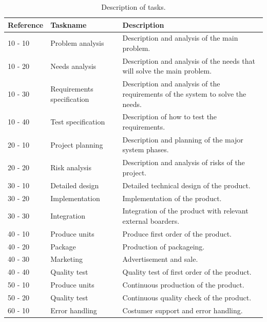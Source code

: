 \begin{table}[H]
\begin{tabular}{|l|l|p{9cm}|}
\hline
\textbf{Reference} & \textbf{Taskname} & \textbf{Description} \\ \hline
10 - 10 & Problem analysis & Description and analysis of the main problem. 
\\  \hline
10 - 20 & Needs analysis & Description and analysis of the needs that will solve the main problem. 
\\  \hline
10 - 30 & Requirements specification & Description and analysis of the requirements of the system to solve the needs. 
\\  \hline 
10 - 40 & Test specification & Description of how to test the requirements.
\\  \hline
20 - 10 & Project planning & Description and planning of the major system phases.
\\  \hline 
20 - 20 & Risk analysis & Description and analysis of risks of the project.
\\ \hline
30 - 10 & Detailed design & Detailed technical design of the product.
\\  \hline
30 - 20 & Implementation & Implementation of the product. 
\\  \hline
30 - 30 & Integration & Integration of the product with relevant external boarders. 
\\  \hline 
40 - 10 & Produce units & Produce first order of the product.
\\  \hline 
40 - 20 & Package & Production of packageing.
\\  \hline 
40 - 30 & Marketing & Advertisement and sale.
\\  \hline 
40 - 40 & Quality test & Quality test of first order of the product.
\\  \hline 
50 - 10 & Produce units & Continuous production of the product.
\\  \hline 
50 - 20 & Quality test & Continuous quality check of the product.
\\  \hline 
60 - 10 & Error handling & Costumer support and error handling.
\\  \hline 
\end{tabular}
\caption{Description of tasks.}
\end{table}